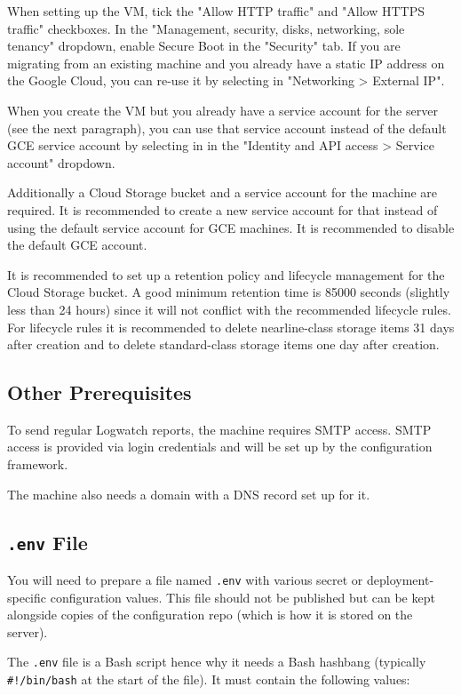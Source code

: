 \documentclass[12pt,a4paper]{report}
\begin{document}
	When setting up the VM, tick the "Allow HTTP traffic" and "Allow HTTPS traffic" checkboxes. In the "Management, security, disks, networking, sole tenancy" dropdown, enable Secure Boot in the "Security" tab. If you are migrating from an existing machine and you already have a static IP address on the Google Cloud, you can re-use it by selecting in "Networking > External IP".
	
	When you create the VM but you already have a service account for the server (see the next paragraph), you can use that service account instead of the default GCE service account by selecting in in the "Identity and API access > Service account" dropdown.
	
	Additionally a Cloud Storage bucket and a service account for the machine are required. It is recommended to create a new service account for that instead of using the default service account for GCE machines. It is recommended to disable the default GCE account.
	
	It is recommended to set up a retention policy and lifecycle management for the Cloud Storage bucket. A good minimum retention time is 85000 seconds (slightly less than 24 hours) since it will not conflict with the recommended lifecycle rules. For lifecycle rules it is recommended to delete nearline-class storage items 31 days after creation and to delete standard-class storage items one day after creation.
	
	\subsection{Other Prerequisites}
	To send regular Logwatch reports, the machine requires SMTP access. SMTP access is provided via login credentials and will be set up by the configuration framework.
	
	The machine also needs a domain with a DNS record set up for it.
	
	\subsection{\lstinline|.env| File}
	You will need to prepare a file named \lstinline|.env| with various secret or deployment-specific configuration values. This file should not be published but can be kept alongside copies of the configuration repo (which is how it is stored on the server).
	
	The \lstinline|.env| file is a Bash script hence why it needs a Bash hashbang (typically \lstinline|#!/bin/bash| at the start of the file). It must contain the following values:
	
\end{document}
